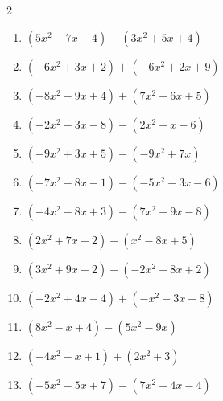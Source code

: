\begin{multicols}{2}
\begin{enumerate}

  \item $(5x^{2}-7x-4)+(3x^{2}+5x+4)$


  \item $(-6x^{2}+3x+2)+(-6x^{2}+2x+9)$


\columnbreak %

  \item $(-8x^{2}-9x+4)+(7x^{2}+6x+5)$


  \item $(-2x^{2}-3x-8)-(2x^{2}+x-6)$


  \item $(-9x^{2}+3x+5)-(-9x^{2}+7x)$

        \phantom{$=-4x+5$}

  \item $(-7x^{2}-8x-1)-(-5x^{2}-3x-6)$


  \item $(-4x^{2}-8x+3)-(7x^{2}-9x-8)$


  \item $(2x^{2}+7x-2)+(x^{2}-8x+5)$


  \item $(3x^{2}+9x-2)-(-2x^{2}-8x+2)$


  \item $(-2x^{2}+4x-4)+(-x^{2}-3x-8)$


  \item $(8x^{2}-x+4)-(5x^{2}-9x)$


  \item $(-4x^{2}-x+1)+(2x^{2}+3)$


  \item $(-5x^{2}-5x+7)-(7x^{2}+4x-4)$



\end{enumerate}
\end{multicols}
